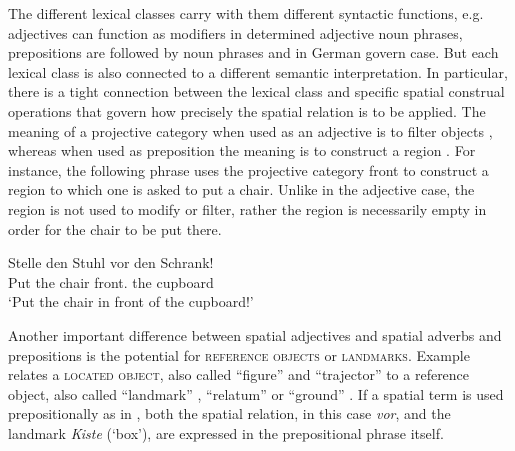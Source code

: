 The different lexical classes carry with them different 
syntactic functions, e.g. adjectives can function as modifiers
in determined adjective noun phrases, prepositions are followed
by noun phrases and in German govern case.  
But each lexical class is also connected 
to a different semantic interpretation. In particular, there is 
a tight connection between the lexical class and specific spatial 
construal operations that govern how precisely the spatial relation is
to be applied. The meaning
of a projective category when used as an adjective is to filter objects 
\citep{tenbrink2007space}, whereas when used as preposition the 
meaning is to construct a region \citep{klabunde1999logic}. 
For instance, the following phrase  uses the projective category
front to construct a region to which one is asked to put a chair. 
Unlike in the adjective case, the region is not used to modify
or filter, rather the region is necessarily empty in order for the chair to be put there. 

\ea
\label{e:5:stelle-den-stuhl-vor-den-schrank}
\gll Stelle den Stuhl vor den Schrank!\\
Put the chair front.{\PREP} the cupboard\\
\glt `Put the chair in front of the cupboard!'\\
\z

Another important difference between spatial adjectives and spatial adverbs and prepositions is the potential
for \textsc{reference objects} or \textsc{landmarks}. Example 
 relates a \textsc{located object}, also called
``figure'' \citep{talmy2000toward2} and ``trajector'' \citep{vandeloise1991spatial}
to a reference object, also called ``landmark'' \citep{vandeloise1991spatial}, 
``relatum'' \citep{tenbrink2007space} or ``ground'' \citep{talmy2000toward2}.
If a spatial term is used prepositionally as in 
, both the spatial relation, in this case 
\textit{vor}, and the landmark \textit{Kiste} (`box'), are expressed in the 
prepositional phrase itself. 

